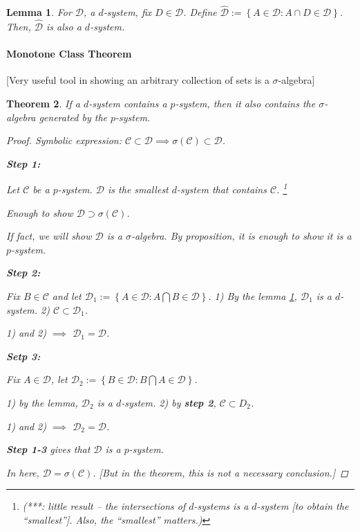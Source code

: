 \documentclass[11pt]{article}
\newtheorem{theorem}{Theorem}[subsection]
\newtheorem{lemma}[theorem]{Lemma}
\begin{document}
\begin{lemma}
  For $\mathcal D$, a $d$-system, fix $D\in \mathcal D$. Define $\hat { \mathcal D}
  := \left\{ A \in \mathcal D : A\cap D \in \mathcal D \right\}$. Then, $\hat
  {\mathcal D} $ is also a $d$-system.
  \label{hw:homework-week1}
\end{lemma}

\paragraph{Monotone Class Theorem}
[Very useful tool in showing an arbitrary collection of sets is a $\sigma$-algebra]

\begin{theorem}
  If a $d$-system contains a $p$-system, then it also contains the
  $\sigma$-algebra generated by the $p$-system.
  \label{thm:monotone-class-theorem}
  \begin{proof}
    Symbolic expression: $\mathcal C \subset \mathcal D \implies \sigma
    (\mathcal C) \subset \mathcal D$.

    \textbf{Step 1: }


    Let $\mathcal C$ be a $p$-system. $\mathcal D$ is the smallest $d$-system
    that contains $\mathcal C$. 
    \footnote{(***: little result -- the intersections of
    $d$-systems is a $d$-system [to obtain the ``smallest'']. Also, the
  ``smallest'' matters.)}

    Enough to show $\mathcal D \supset \sigma (\mathcal C)$. 

    If fact, we will show $\mathcal D$ is a $\sigma$-algebra. By proposition, it
    is enough to show it is a $p$-system. 

    \textbf{Step 2: }

    Fix $B \in \mathcal C$ and let $\mathcal D_1 := \left\{ A \in \mathcal D : A
    \bigcap B \in \mathcal D\right\}$. 1) By the lemma \ref{hw:homework-week1},
    $\mathcal D_1$ is a $d$-system. 2) $\mathcal C \subset \mathcal D_1$. 

    1) and 2) $\implies $ $\mathcal D_1 = \mathcal D$.


    \textbf{Setp 3: }

    Fix $A\in \mathcal D$, let $\mathcal D_2 := \left\{ B \in \mathcal D :
    B\bigcap A \in \mathcal D \right\}$. 

    1) by the lemma, $\mathcal D_2$ is a $d$-system. 2) by \textbf{step 2},
    $\mathcal C \subset D_2$. 

    1) and 2) $\implies$ $\mathcal D_2 = \mathcal D$. 



    \textbf{Step 1-3} gives that $\mathcal D$ is a $p$-system.




    In here, $\mathcal D = \sigma ( \mathcal C)$. [But in the theorem, this is
    not a necessary conclusion.]
  \end{proof}
\end{theorem}
\end{document}
